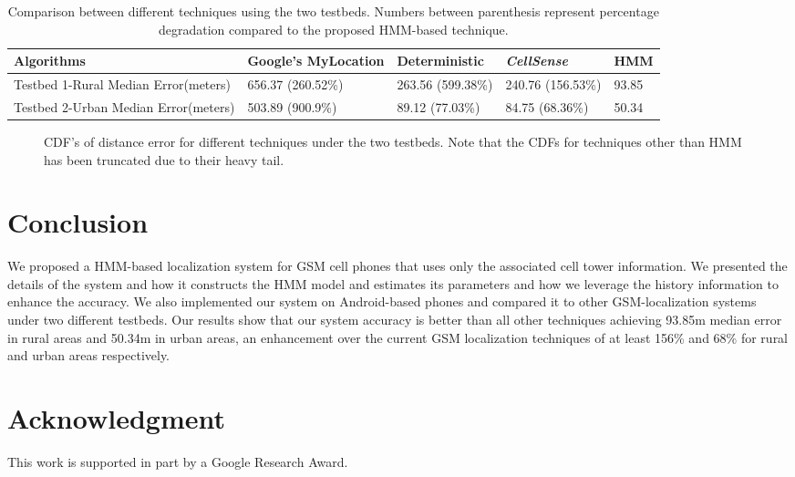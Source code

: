 \documentclass[conference]{IEEEtran}
\begin{document}
\begin{table*}
\centering
\begin{tabular}{|p{2.0in}|p{1.1in}|p{0.9in}|p{0.9in}|p{0.5in}|}
\hline

Algorithms & Google's MyLocation& Deterministic & \textit{CellSense} & HMM\\
\hline Testbed 1-Rural Median Error(meters) & 656.37 (260.52\%)&
263.56 (599.38\%) & 240.76 (156.53\%)& 93.85\\
\hline
Testbed 2-Urban Median Error(meters)& 503.89 (900.9\%) & 89.12 (77.03\%)& 84.75 (68.36\%) & 50.34\\
\hline



\end{tabular}
\caption{Comparison between different techniques using the two
testbeds. Numbers between parenthesis represent percentage
degradation compared to the proposed HMM-based technique.}
\label{compare}
\end{table*}



\begin{figure}[!t]
\centering
  \caption{CDF's of distance error for different techniques under the two testbeds. Note that the CDFs for techniques other than HMM has been truncated due to their heavy tail.}
  \label{fig:cdf}
\end{figure}


\section{Conclusion}\label{conclusion}
We proposed a HMM-based localization system for GSM cell phones that
uses only the associated cell tower information. We presented the
details of the system and how it constructs the HMM model and
estimates its parameters and how we leverage the history information
to enhance the accuracy. We also implemented our system on
Android-based phones and compared it to other GSM-localization
systems under two different testbeds.  Our results show that our
system accuracy is better than all other techniques achieving 93.85m
median error in rural areas and 50.34m in urban areas, an
enhancement over the current GSM localization techniques of at least
156\% and 68\% for rural and urban areas respectively.





\section*{Acknowledgment}
This work is supported in part by a Google Research Award.












  
\end{document}
